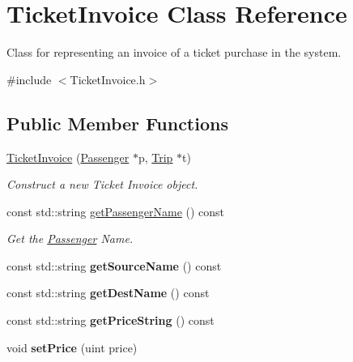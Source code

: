 \hypertarget{classTicketInvoice}{}\section{Ticket\+Invoice Class Reference}
\label{classTicketInvoice}


Class for representing an invoice of a ticket purchase in the system.  




{\ttfamily \#include $<$Ticket\+Invoice.\+h$>$}

\subsection*{Public Member Functions}
\begin{DoxyCompactItemize}
\item 
\mbox{\hyperlink{classTicketInvoice_a38b37e5168ce71bbf37aceef8a6f6267}{Ticket\+Invoice}} (\mbox{\hyperlink{classPassenger}{Passenger}} $\ast$p, \mbox{\hyperlink{classTrip}{Trip}} $\ast$t)
\begin{DoxyCompactList}\small\item\em Construct a new Ticket Invoice object. \end{DoxyCompactList}\item 
const std\+::string \mbox{\hyperlink{classTicketInvoice_a9fdfdcd08ff90480ca85e027f57033e4}{get\+Passenger\+Name}} () const
\begin{DoxyCompactList}\small\item\em Get the \mbox{\hyperlink{classPassenger}{Passenger}} Name. \end{DoxyCompactList}\item 
\mbox{\label{classTicketInvoice_ad692197170d5cb11790dff71150ef891}} 
const std\+::string {\bfseries get\+Source\+Name} () const
\item 
\mbox{\label{classTicketInvoice_a1db4ffac81e11b765c6204278a3df8ff}} 
const std\+::string {\bfseries get\+Dest\+Name} () const
\item 
\mbox{\label{classTicketInvoice_a97998091765f01ff9f394210530a89ed}} 
const std\+::string {\bfseries get\+Price\+String} () const
\item 
\mbox{\label{classTicketInvoice_afeed9962f0276861876a001e372d2063}} 
void {\bfseries set\+Price} (uint price)
\end{DoxyCompactItemize}
